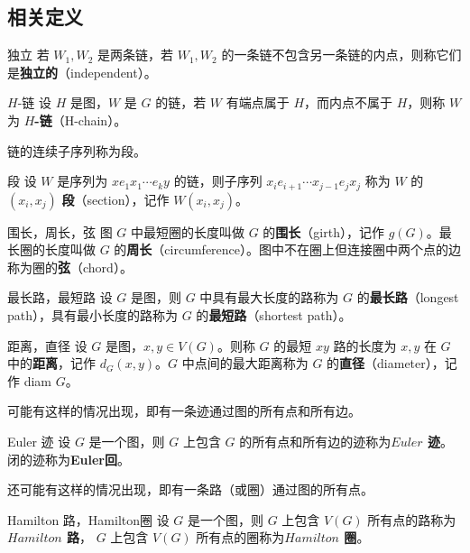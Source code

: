 \subsection{相关定义}

\begin{definition}{独立}
若 $W_1,W_2$ 是两条链，若  $W_1,W_2$ 的一条链不包含另一条链的内点，则称它们是\textbf{独立的}（independent）。 
\end{definition}


\begin{definition}{$H$-链}
设 $H$ 是图，$W$ 是 $G$ 的链，若 $W$ 有端点属于 $H$，而内点不属于 $H$，则称 $W$ 为 \textbf{$H$-链}（H-chain）。 
\end{definition}
链的连续子序列称为段。
\begin{definition}{段}
设 $W$ 是序列为 $xe_1x_1\cdots e_ky$ 的链，则子序列 $x_ie_{i+1}\cdots x_{j-1}e_{j}x_j$ 称为 $W$ 的 $(x_i,x_j)$ \textbf{段}（section），记作 $W(x_i,x_j)$。
\end{definition}

\begin{definition}{围长，周长，弦}
图 $G$ 中最短圈的长度叫做 $G$ 的\textbf{围长}（girth），记作 $g(G)$。最长圈的长度叫做 $G$ 的\textbf{周长}（circumference）。图中不在圈上但连接圈中两个点的边称为圈的\textbf{弦}（chord）。
\end{definition}


\begin{definition}{最长路，最短路}
设 $G$ 是图，则 $G$ 中具有最大长度的路称为 $G$ 的\textbf{最长路}（longest path），具有最小长度的路称为 $G$ 的\textbf{最短路}（shortest path）。
\end{definition}

\begin{definition}{距离，直径}
设 $G$ 是图，$x,y\in V(G)$。则称 $G$ 的最短 $xy$ 路的长度为 $x,y$ 在 $G$ 中的\textbf{距离}，记作 $d_G(x,y)$。$G$ 中点间的最大距离称为 $G$ 的\textbf{直径}（diameter），记作 diam $G$。
\end{definition}

可能有这样的情况出现，即有一条迹通过图的所有点和所有边。
\begin{definition}{Euler 迹}
设 $G$ 是一个图，则 $G$ 上包含 $G$ 的所有点和所有边的迹称为\textbf{$Euler$ 迹}。闭的迹称为\textbf{Euler回}。
\end{definition}


还可能有这样的情况出现，即有一条路（或圈）通过图的所有点。
\begin{definition}{Hamilton 路，Hamilton圈}
设 $G$ 是一个图，则 $G$ 上包含 $V(G)$ 所有点的路称为\textbf{$Hamilton$ 路}， $G$ 上包含 $V(G)$ 所有点的圈称为\textbf{$Hamilton$ 圈}。
\end{definition}



